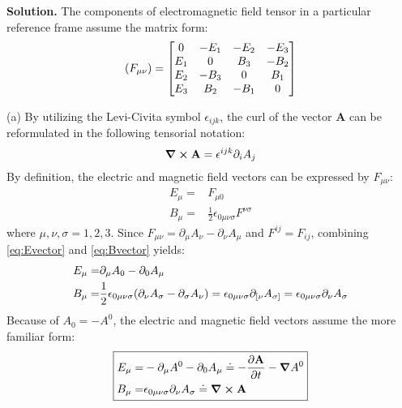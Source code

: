 \documentclass[12pt, a4paper, oneside]{article}
\newenvironment{solution}{\par\noindent\textbf{Solution. }}{\par}
\renewcommand{\vb}[1]{\ensuremath{\mathbf{#1}}}
\newcommand{\p}{\partial}
\begin{document}
\begin{solution}
    The components of electromagnetic field tensor in a particular reference frame assume the matrix form:
    \begin{equation}
        \qty(F_{\mu\nu})=\mqty[0 & -E_1 & -E_2 & -E_3 \\ E_1 & 0 & B_3 & -B_2 \\ E_2 & -B_3 & 0 & B_1 \\ E_3 & B_2 & -B_1 & 0]\label{eq:emtensorcomponents}
    \end{equation}

    (a) By utilizing the Levi-Civita symbol $\epsilon_{ijk}$, the curl of the vector \vb{A} can be reformulated in the following tensorial notation:
    \begin{equation*}
        \curl{\vb{A}}=\epsilon^{ijk}\p_i A_j
    \end{equation*}
    By definition, the electric and magnetic field vectors can be expressed by $F_{\mu\nu}$:
    \begin{align}
        E_\mu =& F_{\mu 0}\label{eq:Evector}\\
        B_\mu =& \frac{1}{2}\epsilon_{0\mu\nu\sigma}F^{\nu\sigma}\label{eq:Bvector}
    \end{align}
    where $\mu, \nu, \sigma = 1, 2, 3$. Since $F_{\mu\nu}=\p_\mu A_\nu - \p_\nu A_\mu$ and $F^{ij}=F_{ij}$, combining \cref{eq:Evector} and \cref{eq:Bvector} yields:
    \begin{align}
        E_\mu = & \p_\mu A_0 - \p_0 A_\mu\\
        B_\mu = & \frac{1}{2}\epsilon_{0\mu\nu\sigma}\qty(\p_\nu A_\sigma-\p_\sigma A_\nu)=\epsilon_{0\mu\nu\sigma}\p_{[\nu}A_{\sigma]}=\epsilon_{0\mu\nu\sigma}\p_\nu A_\sigma
    \end{align}
    Because of $A_0 = -A^0$, the electric and magnetic field vectors assume the more familiar form:
    \begin{align}
        \boxed{
            \begin{aligned}
                E_\mu =& -\p_\mu A^0 - \p_0 A_\mu \doteq -\pdv{\vb{A}}{t}-\grad{A^0}\\
            B_\mu =& \epsilon_{0\mu\nu\sigma}\p_\nu A_\sigma \doteq \curl{\vb{A}}
            \end{aligned}
        }
    \end{align}


\end{solution}
\end{document}
